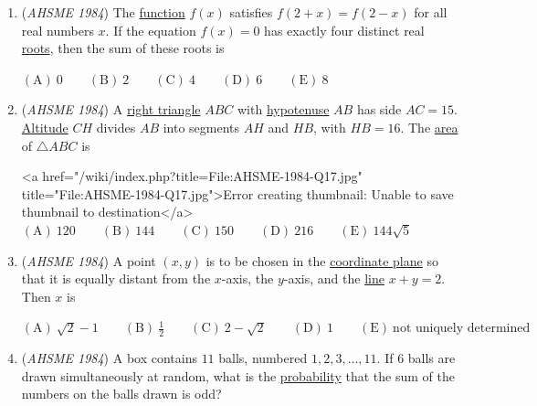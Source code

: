 \begin{enumerate}
 $\mathrm{(A) \ }18^\circ \qquad \mathrm{(B) \ }30^\circ \qquad \mathrm{(C) \ } 36^\circ \qquad \mathrm{(D) \ }45^\circ \qquad \mathrm{(E) \ } 60^\circ$


	\item (\textit{AHSME 1984}) The \href{https://artofproblemsolving.com/wiki/index.php?title=Function}{function} $f(x)$ satisfies $f(2+x)=f(2-x)$ for all real numbers $x$. If the equation $f(x)=0$ has exactly four distinct real \href{https://artofproblemsolving.com/wiki/index.php?title=Root\_(polynomial)}{roots}, then the sum of these roots is


 $\mathrm{(A) \ }0 \qquad \mathrm{(B) \ }2 \qquad \mathrm{(C) \ } 4 \qquad \mathrm{(D) \ }6 \qquad \mathrm{(E) \ } 8$


	\item (\textit{AHSME 1984}) A \href{https://artofproblemsolving.com/wiki/index.php?title=Right\_triangle}{right triangle} $ABC$ with \href{https://artofproblemsolving.com/wiki/index.php?title=Hypotenuse}{hypotenuse} $AB$ has side $AC=15$. \href{https://artofproblemsolving.com/wiki/index.php?title=Altitude}{Altitude} $CH$ divides $AB$ into segments $AH$ and $HB$, with $HB=16$. The \href{https://artofproblemsolving.com/wiki/index.php?title=Area}{area} of $\triangle ABC$ is


 <a href="/wiki/index.php?title=File:AHSME-1984-Q17.jpg" title="File:AHSME-1984-Q17.jpg">Error creating thumbnail: Unable to save thumbnail to destination</a>
$\mathrm{(A) \ }120 \qquad \mathrm{(B) \ }144 \qquad \mathrm{(C) \ } 150 \qquad \mathrm{(D) \ }216 \qquad \mathrm{(E) \ } 144\sqrt{5}$


	\item (\textit{AHSME 1984}) A point $(x, y)$ is to be chosen in the \href{https://artofproblemsolving.com/wiki/index.php?title=Coordinate\_plane}{coordinate plane} so that it is equally distant from the $x$-axis, the $y$-axis, and the \href{https://artofproblemsolving.com/wiki/index.php?title=Line}{line} $x+y=2$. Then $x$ is


 $\mathrm{(A) \ }\sqrt{2}-1 \qquad \mathrm{(B) \ }\frac{1}{2} \qquad \mathrm{(C) \ } 2-\sqrt{2} \qquad \mathrm{(D) \ }1 \qquad \mathrm{(E) \ } \text{not uniquely determined}$


	\item (\textit{AHSME 1984}) A box contains $11$ balls, numbered $1, 2, 3,\ldots,11$. If $6$ balls are drawn simultaneously at random, what is the \href{https://artofproblemsolving.com/wiki/index.php?title=Probability}{probability} that the sum of the numbers on the balls drawn is odd?



\end{enumerate}
